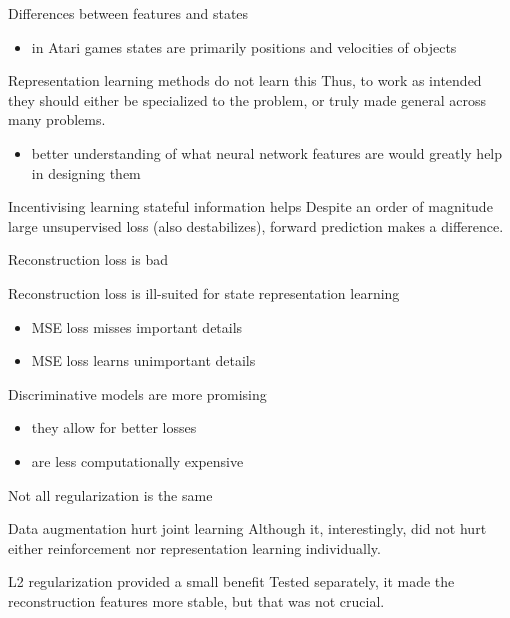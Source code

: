\documentclass{beamer}
\begin{document}
\begin{frame}{Differences between features and states}
		\begin{itemize}
				\item in Atari games states are primarily positions and velocities of objects
		\end{itemize}

	\begin{alertblock}{Representation learning methods do not learn this}
			Thus, to work as intended they should either be specialized to the problem,
			or truly made general across many problems.
	\end{alertblock}
		\begin{itemize}
				\item better understanding of what neural network features are 
						would greatly help in designing them
		\end{itemize}
\pause
	\begin{exampleblock}{Incentivising learning stateful information helps}
			Despite an order of magnitude large unsupervised loss (also destabilizes),
			forward prediction makes a difference.
	\end{exampleblock}
	
\end{frame}

\begin{frame}{Reconstruction loss is bad}
	\begin{alertblock}{Reconstruction loss is ill-suited for state representation learning}
			\begin{itemize}
					\item MSE loss misses important details
					\item MSE loss learns unimportant details
			\end{itemize}
	\end{alertblock}
	\pause
	\begin{exampleblock}{Discriminative models are more promising}
			\begin{itemize}
					\item they allow for better losses
					\item are less computationally expensive
			\end{itemize}
	\end{exampleblock}
	
\end{frame}

\begin{frame}{Not all regularization is the same}
	\begin{alertblock}{Data augmentation hurt joint learning}
			Although it, interestingly, did not hurt either reinforcement 
			nor representation learning individually.
	\end{alertblock}
	\pause
	\begin{exampleblock}{L2 regularization provided a small benefit}
			 Tested separately, it made the reconstruction features more stable,
			 but that was not crucial.
	\end{exampleblock}
	
\end{frame}
\end{document}
